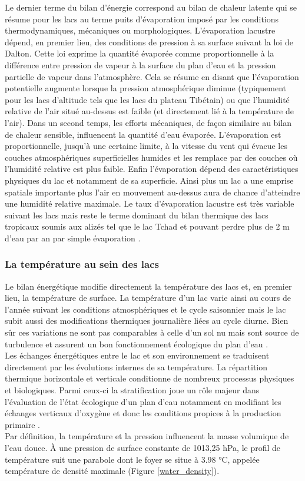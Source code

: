 Le dernier terme du bilan d'énergie correspond au bilan de chaleur latente qui se résume pour les lacs au terme puits d'évaporation imposé par les conditions thermodynamiques, mécaniques ou morphologiques. L'évaporation lacustre dépend, en premier lieu, des conditions de pression à sa surface suivant la loi de Dalton. Cette loi exprime la quantité évaporée comme proportionnelle à la différence entre pression de vapeur à la surface du plan d'eau et la pression partielle de vapeur dans l'atmosphère. Cela se résume en disant que l'évaporation potentielle augmente lorsque la pression atmosphérique diminue (typiquement pour les lacs d'altitude tels que les lacs du plateau Tibétain) ou que l'humidité relative de l'air situé au-dessus est faible (et directement lié à la température de l'air). Dans un second temps, les efforts mécaniques, de façon similaire au bilan de chaleur sensible, influencent la quantité d'eau évaporée. L'évaporation est proportionnelle, jusqu'à une certaine limite, à la vitesse du vent qui évacue les couches atmosphériques superficielles humides et les remplace par des couches où l'humidité relative est plus faible. Enfin l'évaporation dépend des caractéristiques physiques du lac et notamment de sa superficie. Ainsi plus un lac a une emprise spatiale importante plus l'air en mouvement au-dessus aura de chance d'atteindre une humidité relative maximale. Le taux d'évaporation lacustre est très variable suivant les lacs mais reste le terme dominant du bilan thermique des lacs tropicaux soumis aux alizés tel que le lac Tchad et pouvant perdre plus de 2 m d'eau par an par simple évaporation \citep{bouchez2015,pham2020}.

\subsubsection{{\selectfont La température au sein des lacs}}
Le bilan énergétique modifie directement la température des lacs et, en premier lieu, la température de surface. La température d'un lac varie ainsi au cours de l'année suivant les conditions atmosphériques et le cycle saisonnier mais le lac subit aussi des modifications thermiques journalière liées au cycle diurne. Bien sûr ces variations ne sont pas comparables à celle d'un sol nu mais sont source de turbulence et assurent un bon fonctionnement écologique du plan d'eau \citep{bouffard2019}.\\
Les échanges énergétiques entre le lac et son environnement se traduisent directement par les évolutions internes de sa température. La répartition thermique horizontale et verticale conditionne de nombreux processus physiques et biologiques. Parmi ceux-ci la stratification joue un rôle majeur dans l'évaluation de l'état écologique d'un plan d'eau notamment en modifiant les échanges verticaux d'oxygène et donc les conditions propices à la production primaire \citep{elcci2008,piccolroaz2015}.\\
\clearpage
Par définition, la température et la pression influencent la masse volumique de l'eau douce. À une pression de surface constante de 1013,25 hPa, le profil de température suit une parabole dont le foyer se situe à 3.98 °C, appelée température de densité maximale (Figure \ref{water_density}).

